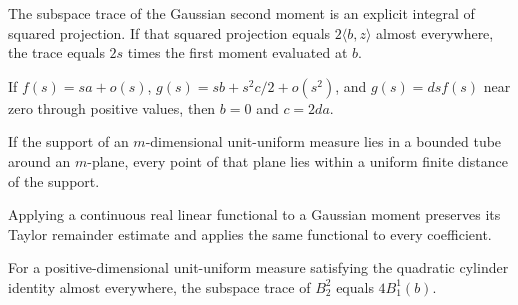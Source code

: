 \begin{lemma}
\label{lem:subspace-gaussian-trace-cylinder}

The subspace trace of the Gaussian second moment is an explicit integral of squared projection. If that squared projection equals $2\langle b,z\rangle$ almost everywhere, the trace equals $2s$ times the first moment evaluated at $b$.
\end{lemma}

\begin{lemma}
\label{lem:taylor-multiply-scale}

If $f(s)=sa+o(s)$, $g(s)=sb+s^2c/2+o(s^2)$, and $g(s)=dsf(s)$ near zero through positive values, then $b=0$ and $c=2da$.
\end{lemma}

\begin{lemma}
\label{lem:bounded-tube-plane-to-support}

If the support of an $m$-dimensional unit-uniform measure lies in a bounded tube around an $m$-plane, every point of that plane lies within a uniform finite distance of the support.
\end{lemma}

\begin{lemma}
\label{lem:moment-taylor-linear-image}

Applying a continuous real linear functional to a Gaussian moment preserves its Taylor remainder estimate and applies the same functional to every coefficient.
\end{lemma}

\begin{lemma}
\label{lem:cylinder-second-coefficient-trace}

For a positive-dimensional unit-uniform measure satisfying the quadratic cylinder identity almost everywhere, the subspace trace of $B_2^2$ equals $4B_1^1(b)$.
\end{lemma}

